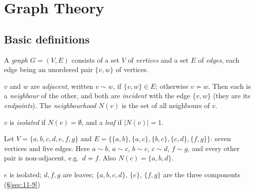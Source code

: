 \newpage
\section{Graph Theory}
\label{sec:graphs}

\subsection{Basic definitions}
\label{sec:11-1}

\begin{definition}[Graph]
A \emph{graph} $G=(V,E)$ consists of a set $V$ of \emph{vertices} and a set $E$ of \emph{edges}, each edge being an unordered pair $\{v,w\}$ of vertices.
\end{definition}

\begin{definition}
$v$ and $w$ are \emph{adjacent}, written $v\sim w$, if $\{v,w\}\in E$; otherwise $v\not\sim w$. Then each is a \emph{neighbour} of the other, and both are \emph{incident} with the edge $\{v,w\}$ (they are its \emph{endpoints}). The \emph{neighbourhood} $N(v)$ is the set of all neighbours of $v$.
\end{definition}

\begin{definition}
$v$ is \emph{isolated} if $N(v)=\emptyset$, and a \emph{leaf} if $|N(v)|=1$.
\end{definition}

\begin{example}
Let $V=\{a,b,c,d,e,f,g\}$ and $E=\{\{a,b\},\{a,c\},\{b,c\},\{c,d\},\{f,g\}\}$: seven vertices and five edges. Here $a\sim b$, $a\sim c$, $b\sim c$, $c\sim d$, $f\sim g$, and every other pair is non-adjacent, e.g.\ $d\not\sim f$. Also $N(c)=\{a,b,d\}$.
\end{example}

\begin{center}
\end{center}
\begin{center}
\small $e$ is isolated; $d,f,g$ are leaves; $\{a,b,c,d\}$, $\{e\}$, $\{f,g\}$ are the three components (\S\ref{sec:11-9})
\end{center}

